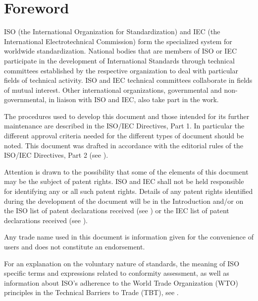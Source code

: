 
\let\OldLibHeader\libheader
\newcommand{\simplelibheader}[1]{\tcode{<#1>}}
\let\libheader\simplelibheader

\chapter{Foreword}

ISO (the International Organization for Standardization) and IEC (the
International Electrotechnical Commission) form the specialized system for
worldwide standardization. National bodies that are members of ISO or IEC
participate in the development of International Standards through technical
committees established by the respective organization to deal with particular
fields of technical activity. ISO and IEC technical committees collaborate in
fields of mutual interest. Other international organizations, governmental and
non-governmental, in liaison with ISO and IEC, also take part in the work.

The procedures used to develop this document and those intended for its further
maintenance are described in the ISO/IEC Directives, Part 1. In particular the
different approval criteria needed for the different types of document should
be noted. This document was drafted in accordance with the editorial rules of
the ISO/IEC Directives, Part 2
(see \href{http://www.iso.org/directives}{}).

Attention is drawn to the possibility that some of the elements of this
document may be the subject of patent rights. ISO and IEC shall not be held
responsible for identifying any or all such patent rights. Details of any
patent rights identified during the development of the document will be in the
Introduction and/or on the ISO list of patent declarations received
(see \href{http://www.iso.org/patents}{})
or the IEC list of patent declarations received
(see \href{http://patents.iec.ch}{}).

Any trade name used in this document is information given for the convenience
of users and does not constitute an endorsement.

For an explanation on
the voluntary nature of standards,
the meaning of ISO specific terms and expressions related
to conformity assessment, as well as information about ISO's adherence
to the World Trade Organization (WTO) principles
in the Technical Barriers to Trade (TBT), see
\href{http://www.iso.org/iso/foreword.html}{}.

